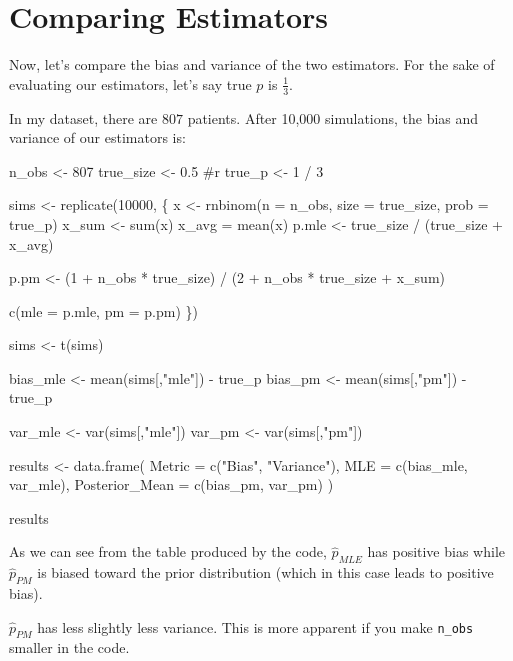 \documentclass[
  letterpaper,
  DIV=11,
  numbers=noendperiod]{scrreprt}
\newenvironment{Shaded}{\begin{snugshade}}{\end{snugshade}}
\newcommand{\NormalTok}[1]{\textcolor[rgb]{0.00,0.23,0.31}{#1}}
\begin{document}
\section{Comparing Estimators}\label{comparing-estimators}

Now, let's compare the bias and variance of the two estimators. For the
sake of evaluating our estimators, let's say true \(p\) is
\(\frac{1}{3}\).

In my dataset, there are \(807\) patients. After 10,000 simulations, the
bias and variance of our estimators is:

\begin{Shaded}
\begin{Highlighting}[]
\NormalTok{n\_obs \textless{}{-} 807}
\NormalTok{true\_size \textless{}{-} 0.5 \#r}
\NormalTok{true\_p \textless{}{-} 1 / 3}

\NormalTok{sims \textless{}{-} replicate(10000, \{}
\NormalTok{  x \textless{}{-} rnbinom(n = n\_obs, size = true\_size, prob = true\_p)}
\NormalTok{  x\_sum \textless{}{-} sum(x)}
\NormalTok{  x\_avg = mean(x)}
\NormalTok{  p.mle \textless{}{-} true\_size / (true\_size + x\_avg)}
  
\NormalTok{  p.pm \textless{}{-} (1 + n\_obs * true\_size) / (2 + n\_obs * true\_size + x\_sum)}
  
\NormalTok{  c(mle = p.mle, pm = p.pm)}
\NormalTok{\})}

\NormalTok{sims \textless{}{-} t(sims)}

\NormalTok{bias\_mle \textless{}{-} mean(sims[,"mle"]) {-} true\_p}
\NormalTok{bias\_pm \textless{}{-} mean(sims[,"pm"]) {-} true\_p}

\NormalTok{var\_mle \textless{}{-} var(sims[,"mle"])}
\NormalTok{var\_pm \textless{}{-} var(sims[,"pm"])}

\NormalTok{results \textless{}{-} data.frame(}
\NormalTok{  Metric = c("Bias", "Variance"),}
\NormalTok{  MLE = c(bias\_mle, var\_mle),}
\NormalTok{  Posterior\_Mean = c(bias\_pm, var\_pm)}
\NormalTok{)}

\NormalTok{results}
\end{Highlighting}
\end{Shaded}

As we can see from the table produced by the code, \(\hat{p}_{MLE}\) has
positive bias while \(\hat{p}_{PM}\) is biased toward the prior
distribution (which in this case leads to positive bias).

\(\hat{p}_{PM}\) has less slightly less variance. This is more apparent
if you make \texttt{n\_obs} smaller in the code.
\end{document}
